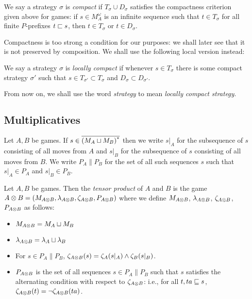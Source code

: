 \documentclass{article}
\begin{document}
\begin{definition}
  We say a strategy $\sigma$ is \emph{compact} if $T_\sigma\cup D_\sigma$ satisfies the compactness criterion given above for games: if $s\in M_A^\omega$ is an infinite sequence such that $t\in T_\sigma$ for all finite $P$-prefixes $t\sqsubset s$, then $t\in T_\sigma$ or $t\in D_\sigma$.  
\end{definition}

Compactness is too strong a condition for our purposes: we shall later see that it is not preserved by composition.  We shall use the following local version instead:

\begin{definition}
  We say a strategy $\sigma$ is \emph{locally compact} if whenever $s\in T_\sigma$ there is some compact strategy $\sigma'$ such that $s\in T_{\sigma'}\subset T_\sigma$ and $D_\sigma\subset D_{\sigma'}$.
\end{definition}

From now on, we shall use the word \emph{strategy} to mean \emph{locally compact strategy}.

\subsection{Multiplicatives}

Let $A,B$ be games.  If $s\in {\overline{{(M_A\sqcup M_B)}^{*}}}$ then we write $s\vert_A$ for the subsequence of $s$ consisting of all moves from $A$ and $s\vert_B$ for the subsequence of $s$ consisting of all moves from $B$.  We write $P_A\|P_B$ for the set of all such sequences $s$ such that $s\vert_A\in P_A$ and $s\vert_B\in P_B$.  

\begin{definition}
  Let $A,B$ be games.  Then the \emph{tensor product} of $A$ and $B$ is the game $A\otimes B=(M_{A\otimes B}, \lambda_{A\otimes B}, \zeta_{A\otimes B}, P_{A\otimes B})$ where we define $M_{A\otimes B}$, $\lambda_{A\otimes B}$, $\zeta_{A\otimes B}$, $P_{A\otimes B}$ as follows:
  \begin{itemize}
    \item $M_{A\otimes B} = M_A \sqcup M_B$
    \item $\lambda_{A\otimes B} = \lambda_A \sqcup \lambda_B$
    \item For $s\in P_A\|P_B$, $\zeta_{A\otimes B}(s) = \zeta_A(s\vert_A) \wedge \zeta_B(s\vert_B)$.
    \item $P_{A\otimes B}$ is the set of all sequences $s\in P_A\|P_B$ such that $s$ satisfies the alternating condition with respect to $\zeta_{A\otimes B}$: i.e., for all $t,ta\sqsubseteq s$, $\zeta_{A\otimes B}(t) = \neg\zeta_{A\otimes B}(ta)$.  
  \end{itemize}
\end{definition}
\end{document}
